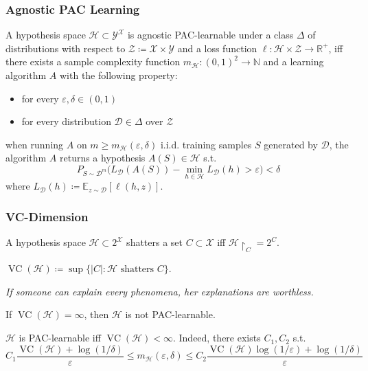 \documentclass[UTF8,11pt,colorlinks,compress,openany]{beamer}%
\begin{document}
\begin{frame}\frametitle{Agnostic PAC Learning}
\setlength\abovedisplayskip{0pt}
\setlength\belowdisplayskip{0pt}
	\begin{definition}
		A hypothesis space $\mathcal{H}\subset\mathcal{Y}^{\mathcal{X}}$ is agnostic PAC-learnable under a class $\Delta$ of distributions with respect to $\mathcal{Z}\coloneqq \mathcal{X}\times\mathcal{Y}$ and a loss function $\ell:\mathcal{H}\times\mathcal{Z}\to\mathbb{R}^+$, iff there exists a sample complexity function $m_{\mathcal{H}}: (0,1)^2\to\mathbb{N}$ and a learning algorithm $A$ with the following property:
		\begin{itemize}
			\item for every $\varepsilon,\delta\in(0,1)$
			\item for every distribution $\mathcal{D}\in\Delta$ over $\mathcal{Z}$
		\end{itemize}
		when running $A$ on $m\geq m_{\mathcal{H}}(\varepsilon,\delta)$ i.i.d. training samples $S$ generated by $\mathcal{D}$, the algorithm $A$ returns a hypothesis $A(S)\in\mathcal{H}$ s.t.
		\[P_{S\sim\mathcal{D}^m}\Big(L_{\mathcal{D}}(A(S))-\min\limits_{h\in\mathcal{H}}L_{\mathcal{D}}(h)>\varepsilon\Big)<\delta\]
		where $L_{\mathcal{D}}(h)\coloneqq \mathbb{E}_{z\sim\mathcal{D}}\left[\ell(h,z)\right]$.
	\end{definition}
\end{frame}

\begin{frame}\frametitle{VC-Dimension}
\begin{definition}[Shattering]
A hypothesis space $\mathcal{H}\subset 2^{\mathcal{X}}$ shatters a set $C\subset\mathcal{X}$ iff $\mathcal{H}{\restriction_C}=2^C$.
\end{definition}
\begin{definition}[VC-Dimension]
$\operatorname{VC}(\mathcal{H})\coloneqq \sup\big\{|C|: \mathcal{H} \mbox{ shatters } C\big\}$.
\end{definition}
{\footnotesize\emph{If someone can explain every phenomena, her explanations are worthless.}}
\begin{theorem}
If $\operatorname{VC}(\mathcal{H})=\infty$, then $\mathcal{H}$ is not PAC-learnable.
\end{theorem}
\begin{theorem}
$\mathcal{H}$ is PAC-learnable iff $\operatorname{VC}(\mathcal{H})<\infty$. Indeed, there exists $C_1,C_2$ s.t.
\[C_1\frac{\operatorname{VC}(\mathcal{H})+\log(1/\delta)}{\varepsilon}\leq m_{\mathcal{H}}(\varepsilon,\delta)\leq C_2\frac{\operatorname{VC}(\mathcal{H})\log(1/\varepsilon)+\log(1/\delta)}{\varepsilon}\]
\end{theorem}
\end{frame}
\end{document}
